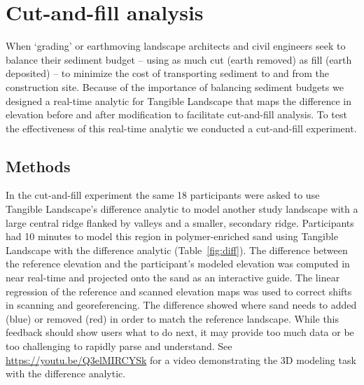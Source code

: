 \documentclass[Afour,sageh,times]{sagej}
\begin{document}
\section{Cut-and-fill analysis}
When `grading' or earthmoving
landscape architects and civil engineers
seek to balance their sediment budget 
-- using as much cut (earth removed) 
as fill (earth deposited) --
to minimize the cost of transporting sediment to and from
the construction site.
Because of the importance 
of balancing sediment budgets
we designed a real-time analytic 
for Tangible Landscape that 
maps the difference in elevation
before and after modification
to facilitate cut-and-fill analysis. 
To test the effectiveness of this real-time analytic
we conducted a cut-and-fill experiment.

\subsection{Methods}
In the cut-and-fill experiment 
the same 18 participants were asked to use 
Tangible Landscape's difference analytic to model 
another study landscape
with a large central ridge 
flanked by valleys 
and a smaller, secondary ridge.
Participants had 10 minutes to model this region
in polymer-enriched sand using Tangible Landscape 
with the difference analytic (Table~\ref{fig:diff}). 
The difference between the reference elevation 
and the participant's modeled elevation
was computed in near real-time and projected onto the sand 
as an interactive guide.
The linear regression of the reference and scanned elevation maps 
was used to correct shifts in scanning and georeferencing. 
The difference showed where sand needs to added (blue) or removed (red) 
in order to match the reference landscape.
While this feedback should show users what to do next, 
it may provide too much data 
or be too challenging to rapidly parse and understand.
See \url{https://youtu.be/Q3elMIRCYSk}
for a video demonstrating the 3D modeling task 
with the difference analytic.
\end{document}
